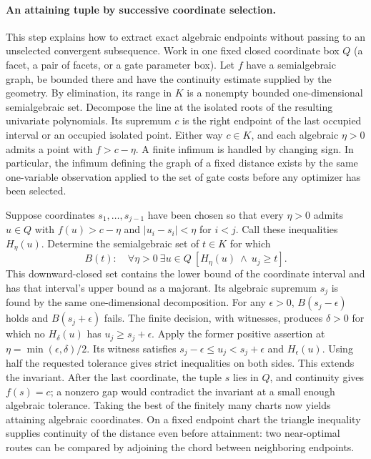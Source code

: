 \documentclass[10pt,letterpaper]{article}
\begin{document}
\paragraph{An attaining tuple by successive coordinate selection.}
This step explains how to extract exact algebraic endpoints without
passing to an unselected convergent subsequence. Work in one fixed
closed coordinate box $Q$ (a facet, a pair of facets, or a gate
parameter box). Let $f$ have a semialgebraic graph, be bounded there
and have the continuity estimate supplied by the geometry. By
elimination, its range in $K$ is a nonempty bounded
one-dimensional semialgebraic set. Decompose the line at the isolated
roots of the resulting univariate polynomials. Its supremum $c$ is
the right endpoint of the last occupied interval or an occupied
isolated point. Either way $c\in K$, and each algebraic $\eta>0$
admits a point with $f>c-\eta$. A finite infimum is handled by changing
sign. In particular, the infimum defining the graph of a fixed
distance exists by the same one-variable observation applied to the
set of gate costs before any optimizer has been selected.

Suppose coordinates $s_1,\ldots,s_{j-1}$ have been chosen so that
every $\eta>0$ admits $u\in Q$ with
$f(u)>c-\eta$ and $|u_i-s_i|<\eta$ for $i<j$.
Call these inequalities $H_\eta(u)$. Determine the semialgebraic
set of $t\in K$ for which
\[
       B(t):\quad \forall\eta>0\ \exists u\in Q\
                   [H_\eta(u)\ \wedge\ u_j\ge t].
\]
This downward-closed set contains the lower bound of the coordinate
interval and has that interval's upper bound as a majorant.
Its algebraic supremum $s_j$ is found by the same one-dimensional
decomposition. For any $\epsilon>0$, $B(s_j-\epsilon)$ holds and
$B(s_j+\epsilon)$ fails. The finite decision, with witnesses,
produces $\delta>0$ for which no $H_\delta(u)$ has
$u_j\ge s_j+\epsilon$. Apply the former positive assertion at
$\eta=\min(\epsilon,\delta)/2$. Its witness satisfies
$s_j-\epsilon\le u_j<s_j+\epsilon$ and $H_\epsilon(u)$.
Using half the requested tolerance gives strict inequalities on
both sides. This extends the invariant. After the last coordinate,
the tuple $s$ lies in $Q$, and continuity gives $f(s)=c$; a
nonzero gap would contradict the invariant at a small enough
algebraic tolerance. Taking the best of the finitely many charts
now yields attaining algebraic coordinates. On a fixed endpoint
chart the triangle inequality supplies continuity of the distance
even before attainment: two near-optimal routes can be compared
by adjoining the chord between neighboring endpoints.
\end{document}
